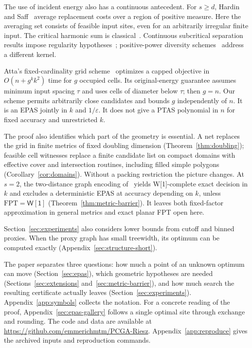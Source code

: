 \documentclass[a4paper,12pt]{article}
\numberwithin{equation}{section}
\begin{document}
The use of incident energy also has a continuous antecedent. For $s\ge d$, Hardin and Saff~\cite[Theorem 2.3, Section 6,
equations (59)--(64)]{hardinSaff2005} average replacement costs over a region of positive measure.
Here the averaging set consists of feasible input sites, even for an arbitrarily irregular finite
input. The critical harmonic sum is classical~\cite[Lemma 3.1]{hardinSaff2005}. Continuous
subcritical separation results impose regularity hypotheses~\cite[Theorems 2.3,
2.5]{hardinEtAl2019}; positive-power diversity schemes~\cite[Theorem 4]{cevallos2018} address a
different kernel.

Atta's fixed-cardinality grid scheme~\cite[Sections 6.2--6.4]{atta2026} optimizes a capped
objective in $O(n+g^k k^2)$ time for $g$ occupied cells. Its original-energy guarantee assumes
minimum input spacing $\tau$ and uses cells of diameter below $\tau$; then $g=n$. Our scheme
permits arbitrarily close candidates and bounds $g$ independently of $n$. It is an EPAS jointly in
$k$ and $1/\varepsilon$. It does not give a PTAS polynomial in $n$ for fixed accuracy and
unrestricted $k$.

The proof also identifies which part of the geometry is essential. A net replaces the grid in
finite metrics of fixed doubling dimension (Theorem~\ref{thm:doubling}); feasible cell witnesses
replace a finite candidate list on compact domains with effective cover and intersection routines,
including filled simple polygons (Corollary~\ref{cor:domains}). Without a packing restriction the
picture changes. At $s=2$, the two-distance graph encoding of~\cite{atta2026,metric2026} yields
W[1]-complete exact decision in $k$ and excludes a deterministic EPAS at accuracy depending on
$k$, unless $\mathrm{FPT}=\mathsf{W[1]}$ (Theorem~\ref{thm:metric-barrier}). It leaves both
fixed-factor approximation in general metrics and exact planar FPT open here.

Section~\ref{sec:experiments} also considers lower bounds from cutoff and binned proxies.
When the proxy graph has small treewidth, its optimum can be computed exactly
(Appendix~\ref{sec:structure-short}).

The paper separates three questions: how much a point of an unknown optimum can move
(Section~\ref{sec:epas}), which geometric hypotheses are needed
(Sections~\ref{sec:extensions} and~\ref{sec:metric-barrier}), and how much search
the resulting certificate actually leaves (Section~\ref{sec:experiments}).
Appendix~\ref{app:symbols} collects the notation. For a concrete reading of the
proof, Appendix~\ref{sec:epas-gallery} follows a single optimal site through exchange and rounding.
The code and data are available at \url{https://github.com/emmerichmtm/PCGA-Riesz}.
Appendix~\ref{app:reproduce} gives the archived inputs and reproduction commands.
\end{document}
